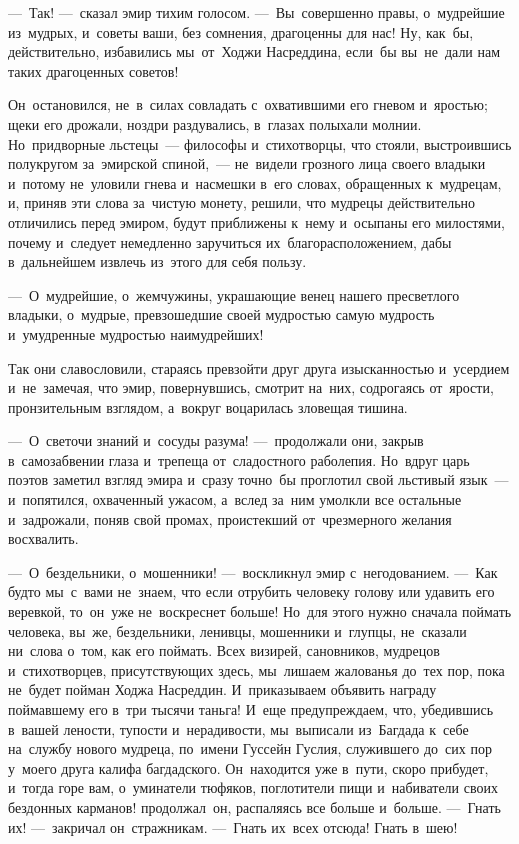 \documentclass[12pt,a4paper]{book}
\begin{document}
—~Так! —~сказал эмир тихим голосом. —~Вы~совершенно правы, о~мудрейшие из~мудрых, и~советы ваши, без сомнения, драгоценны для нас! Ну, как~бы, действительно, избавились мы~от~Ходжи Насреддина, если~бы вы~не~дали нам таких драгоценных советов!

Он~остановился, не~в~силах совладать с~охватившими его гневом и~яростью; щеки его дрожали, ноздри раздувались, в~глазах полыхали молнии. Но~придворные льстецы~— философы и~стихотворцы, что стояли, выстроившись полукругом за~эмирской спиной,~— не~видели грозного лица своего владыки и~потому не~уловили гнева и~насмешки в~его словах, обращенных к~мудрецам, и, приняв эти слова за~чистую монету, решили, что мудрецы действительно отличились перед эмиром, будут приближены к~нему и~осыпаны его милостями, почему и~следует немедленно заручиться их~благорасположением, дабы в~дальнейшем извлечь из~этого для себя пользу.

—~О~мудрейшие, о~жемчужины, украшающие венец нашего пресветлого владыки, о~мудрые, превзошедшие своей мудростью самую мудрость и~умудренные мудростью наимудрейших!

Так они славословили, стараясь превзойти друг друга изысканностью и~усердием и~не~замечая, что эмир, повернувшись, смотрит на~них, содрогаясь от~ярости, пронзительным взглядом, а~вокруг воцарилась зловещая тишина.

—~О~светочи знаний и~сосуды разума! —~продолжали они, закрыв в~самозабвении глаза и~трепеща от~сладостного раболепия. Но~вдруг царь поэтов заметил взгляд эмира и~сразу точно~бы проглотил свой льстивый язык~— и~попятился, охваченный ужасом, а~вслед за~ним умолкли все остальные и~задрожали, поняв свой промах, проистекший от~чрезмерного желания восхвалить.

—~О~бездельники, о~мошенники! —~воскликнул эмир с~негодованием. —~Как будто мы~с~вами не~знаем, что если отрубить человеку голову или удавить его веревкой, то~он~уже не~воскреснет больше! Но~для этого нужно сначала поймать человека, вы~же, бездельники, ленивцы, мошенники и~глупцы, не~сказали ни~слова о~том, как его поймать. Всех визирей, сановников, мудрецов и~стихотворцев, присутствующих здесь, мы~лишаем жалованья до~тех пор, пока не~будет пойман Ходжа Насреддин. И~приказываем объявить награду поймавшему его в~три тысячи таньга! И~еще предупреждаем, что, убедившись в~вашей лености, тупости и~нерадивости, мы~выписали из~Багдада к~себе на~службу нового мудреца, по~имени Гуссейн Гуслия, служившего до~сих пор у~моего друга калифа багдадского. Он~находится уже в~пути, скоро прибудет, и~тогда горе вам, о~уминатели тюфяков, поглотители пищи и~набиватели своих бездонных карманов! продолжал~он, распаляясь все больше и~больше. —~Гнать их! —~закричал он~стражникам. —~Гнать их~всех отсюда! Гнать в~шею!
\end{document}
